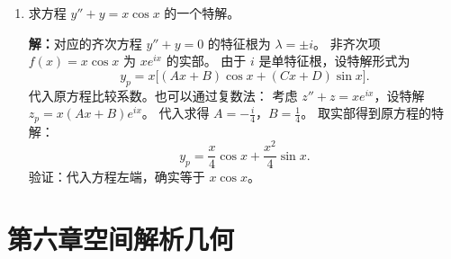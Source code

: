 \documentclass[12pt,a4paper]{ctexart}
\begin{document}
\begin{enumerate}[leftmargin=*,label=\arabic*.,start=28]
  \item 求方程 $y'' + y = x\cos x$ 的一个特解。

    \textbf{解：}对应的齐次方程 $y''+y=0$ 的特征根为 $\lambda = \pm i$。
    非齐次项 $f(x) = x\cos x$ 为 $x e^{ix}$ 的实部。
    由于 $i$ 是单特征根，设特解形式为
    \[
    y_p = x\bigl[(Ax+B)\cos x + (Cx+D)\sin x\bigr].
    \]
    代入原方程比较系数。也可以通过复数法：
    考虑 $z'' + z = x e^{ix}$，设特解 $z_p = x(Ax+B)e^{ix}$。
    代入求得 $A = -\frac{i}{4}$，$B = \frac{1}{4}$。
    取实部得到原方程的特解：
    \[
    y_p = \frac{x}{4}\cos x + \frac{x^2}{4}\sin x.
    \]
    验证：代入方程左端，确实等于 $x\cos x$。
\end{enumerate}

\section*{第六章\quad 空间解析几何}
\end{document}
